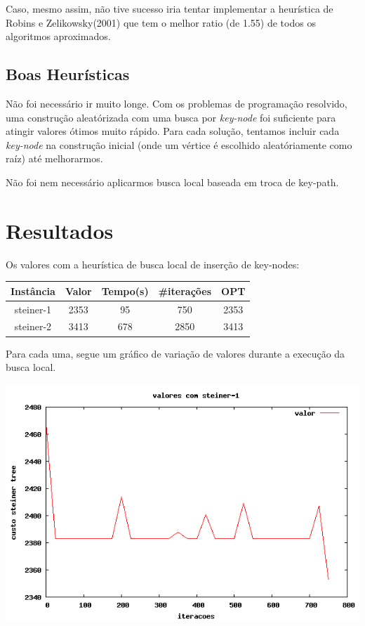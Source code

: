 \documentclass[a4paper,10pt,brazilian]{article}
\begin{document}
Caso, mesmo assim, não tive sucesso iria tentar implementar a heurística de Robins e Zelikowsky(2001) que tem o melhor ratio (de 1.55) de todos os algoritmos aproximados. 

\subsection{Boas Heurísticas}

Não foi necessário ir muito longe. Com os problemas de programação resolvido, uma construção aleatórizada com uma busca por \textit{key-node} foi suficiente para atingir valores ótimos muito rápido. Para cada solução, tentamos incluir cada \textit{key-node} na construção inicial (onde um vértice é escolhido aleatóriamente como raíz) até melhorarmos. 

Não foi nem necessário aplicarmos busca local baseada em troca de key-path.

\section{Resultados}

Os valores com a heurística de busca local de inserção de key-nodes:

\begin{tabular}{|c|c|c|c|c|}
\hline  Instância & Valor  & Tempo(s)  & \#iterações & OPT  \\ 
\hline  steiner-1 &  2353 &  95 & 750 & 2353 \\ 
\hline  steiner-2 &  3413 &  678 & 2850 & 3413  \\ 
\hline 
\end{tabular} 

Para cada uma, segue um gráfico de variação de valores durante a execução da busca local.

\includegraphics[scale=0.5]{1graph.png} 
\end{document}
